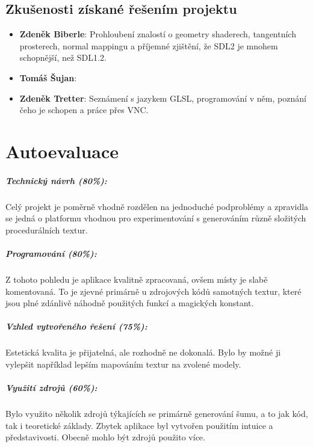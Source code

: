 \documentclass[12pt,a4paper,titlepage,final]{report}
\newcommand\AuthorA{Zdeněk Biberle}
\newcommand\AuthorB{Tomáš Šujan}
\newcommand\AuthorC{Zdeněk Tretter}
\begin{document}
\section{Zkušenosti získané řešením projektu}

\begin{itemize}
\item \textbf{\AuthorA}: Prohloubení znalostí o geometry shaderech, tangentních prosterech, normal mappingu a příjemné zjištění, že SDL2 je mnohem schopnější, než SDL1.2.
\item \textbf{\AuthorB}:
\item \textbf{\AuthorC}: Seznámení s jazykem GLSL, programování v něm, poznání čeho je schopen a práce přes VNC.
\end{itemize}

\chapter{Autoevaluace}

\paragraph{Technický návrh (80\%):} Celý projekt je poměrně vhodně rozdělen na jednoduché podproblémy a zpravidla se jedná o platformu vhodnou pro experimentování s generováním různě složitých procedurálních textur.

\paragraph{Programování (80\%):} Z tohoto pohledu je aplikace kvalitně zpracovaná, ovšem místy je slabě komentovaná. To je zjevné primárně u zdrojových kódů samotných textur, které jsou plné zdánlivě náhodně použitých funkcí a magických konstant.

\paragraph{Vzhled vytvořeného řešení (75\%):} Estetická kvalita je přijatelná, ale rozhodně ne dokonalá. Bylo by možné ji vylepšit například lepším mapováním textur na zvolené modely.

\paragraph{Využití zdrojů (60\%):} Bylo využito několik zdrojů týkajících se primárně generování šumu, a to jak kód, tak i teoretické základy. Zbytek aplikace byl vytvořen použitím intuice a představivosti. Obecně mohlo být zdrojů použito více.
\end{document}
